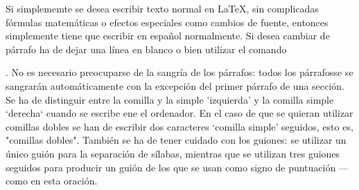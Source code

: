 \documentclass[a4paper,10pt]{letter}
\begin{document}
Si simplememte se desea escribir texto normal en LaTeX,
sin complicadas fórmulas matemáticas o efectos especiales
como cambios de fuente, entonces simplemente tiene que escribir
en español normalmente.
Si desea cambiar de párrafo ha de dejar una línea en blanco o bien
utilizar el comando \par.
No es necesario preocuparse de la sangría de los párrafos:
todos los párrafosse se sangrarán automáticamente con la excepción
del primer párrafo de una sección.
Se ha de distinguir entre la comilla y la simple 'izquierda'
y la comilla simple `derecha` cuando se escribe ene el ordenador.
En el caso de que se quieran utilizar comillas dobles se han de
escribir dos caracteres `comilla simple' seguidos, esto es,
"comillas dobles".
También se ha de tener cuidado con los guiones: se utilizar un único
guión para la separación de sílabas, mientras que se utilizan
tres guiones seguidos para producir un guión de los que se usan
como signo de puntuación --- como en esta oración.
\end{document}
